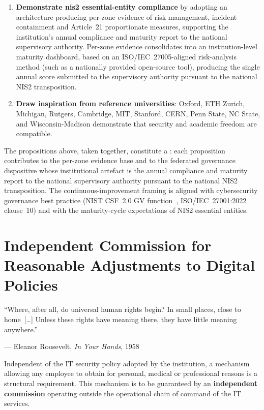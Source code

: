 \begin{enumerate}
    \item \textbf{Demonstrate \gls{nis2} essential-entity compliance} by
    adopting an architecture producing per-zone evidence of risk
    management, incident containment and Article~21 proportionate
    measures, supporting the institution's annual compliance and
    maturity report to the national supervisory authority.
    Per-zone evidence consolidates into an institution-level maturity
    dashboard, based on an ISO/IEC~27005-aligned risk-analysis method
    (such as a nationally provided open-source tool),
    producing the single annual score submitted to the supervisory
    authority pursuant to the national NIS2 transposition.

    \item \textbf{Draw inspiration from reference universities}:
    Oxford, ETH Zurich, Michigan, Rutgers, Cambridge, MIT, Stanford,
    CERN, Penn State, NC State, and Wisconsin-Madison demonstrate that
    security and academic freedom are compatible.
\end{enumerate}

\medskip
\noindent The propositions above, taken together, constitute a
: each proposition
contributes to the per-zone evidence base and to the federated
governance dispositive whose institutional artefact is the annual
compliance and maturity report to the
national supervisory authority pursuant to the national NIS2
transposition. The continuous-improvement
framing is aligned with cybersecurity governance best practice
(NIST CSF~2.0 GV function~\cite{nist-csf}, ISO/IEC~27001:2022
clause~10) and with the maturity-cycle expectations of NIS2
essential entities.

\section{Independent Commission for Reasonable Adjustments to Digital Policies}
\label{sec:commission-ajustements}

\epigraph{``Where, after all, do universal human rights begin? In small places, close to home~[\ldots] Unless these rights have meaning there, they have little meaning anywhere.''}{--- Eleanor Roosevelt, \textit{In Your Hands}, 1958~\cite{roosevelt1958}}

Independent of the IT security policy adopted by the institution,
a mechanism allowing any employee to obtain
 for personal, medical or
professional reasons is a structural requirement. This mechanism
is to be guaranteed by an \textbf{independent commission}
operating outside the operational chain of command of the IT
services.

